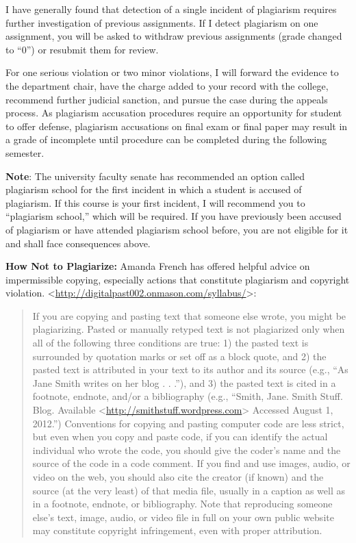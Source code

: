 \documentclass[]{article}
\begin{document}
I have generally found that detection of a single incident of plagiarism
requires further investigation of previous assignments. If I detect
plagiarism on one assignment, you will be asked to withdraw previous
assignments (grade changed to ``0'') or resubmit them for review.

For one serious violation or two minor violations, I will forward the
evidence to the department chair, have the charge added to your record
with the college, recommend further judicial sanction, and pursue the
case during the appeals process. As plagiarism accusation procedures
require an opportunity for student to offer defense, plagiarism
accusations on final exam or final paper may result in a grade of
incomplete until procedure can be completed during the following
semester.

\textbf{Note}: The university faculty senate has recommended an option
called plagiarism school for the first incident in which a student is
accused of plagiarism. If this course is your first incident, I will
recommend you to ``plagiarism school,'' which will be required. If you
have previously been accused of plagiarism or have attended plagiarism
school before, you are not eligible for it and shall face consequences
above.

\textbf{How Not to Plagiarize: } Amanda French has offered helpful
advice on impermissible copying, especially actions that constitute
plagiarism and copyright violation.
\textless{}\url{http://digitalpast002.onmason.com/syllabus/}\textgreater{}:

\begin{quote}
If you are copying and pasting text that someone else wrote, you might
be plagiarizing. Pasted or manually retyped text is not plagiarized only
when all of the following three conditions are true: 1) the pasted text
is surrounded by quotation marks or set off as a block quote, and 2) the
pasted text is attributed in your text to its author and its source
(e.g., ``As Jane Smith writes on her blog . . .''), and 3) the pasted
text is cited in a footnote, endnote, and/or a bibliography (e.g.,
``Smith, Jane. Smith Stuff. Blog. Available
\textless{}\url{http://smithstuff.wordpress.com}\textgreater{} Accessed
August 1, 2012.'') Conventions for copying and pasting computer code are
less strict, but even when you copy and paste code, if you can identify
the actual individual who wrote the code, you should give the coder's
name and the source of the code in a code comment. If you find and use
images, audio, or video on the web, you should also cite the creator (if
known) and the source (at the very least) of that media file, usually in
a caption as well as in a footnote, endnote, or bibliography. Note that
reproducing someone else's text, image, audio, or video file in full on
your own public website may constitute copyright infringement, even with
proper attribution.
\end{quote}
\end{document}
